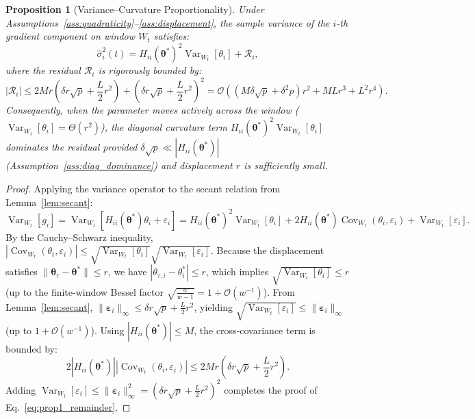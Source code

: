 \documentclass[11pt,a4paper]{article}
\newtheorem{proposition}{Proposition}
\begin{document}
\begin{proposition}[Variance--Curvature Proportionality]
\label{prop:variance_curvature}
Under Assumptions~\ref{ass:quadraticity}--\ref{ass:displacement}, the sample variance of the $i$-th gradient component on window $W_t$ satisfies:
\begin{equation}
\hat{\sigma}_i^2(t) = H_{ii}(\boldsymbol{\theta}^*)^2 \operatorname{Var}_{W_t}[\theta_i] + \mathcal{R}_i,
\end{equation}
where the residual $\mathcal{R}_i$ is rigorously bounded by:
\begin{equation}
|\mathcal{R}_i| \le 2 M r \left( \delta r \sqrt{p} + \frac{L}{2} r^2 \right) + \left( \delta r \sqrt{p} + \frac{L}{2} r^2 \right)^2 = \mathcal{O}\left( (M \delta \sqrt{p} + \delta^2 p) r^2 + M L r^3 + L^2 r^4 \right).
\label{eq:prop1_remainder}
\end{equation}
Consequently, when the parameter moves actively across the window ($\operatorname{Var}_{W_t}[\theta_i] = \Theta(r^2)$), the diagonal curvature term $H_{ii}(\boldsymbol{\theta}^*)^2 \operatorname{Var}_{W_t}[\theta_i]$ dominates the residual provided $\delta \sqrt{p} \ll |H_{ii}(\boldsymbol{\theta}^*)|$ (Assumption~\ref{ass:diag_dominance}) and displacement $r$ is sufficiently small.
\end{proposition}

\begin{proof}
Applying the variance operator to the secant relation from Lemma~\ref{lem:secant}:
\begin{equation}
\operatorname{Var}_{W_t}[g_i] = \operatorname{Var}_{W_t}\left[ H_{ii}(\boldsymbol{\theta}^*) \theta_i + \varepsilon_i \right] = H_{ii}(\boldsymbol{\theta}^*)^2 \operatorname{Var}_{W_t}[\theta_i] + 2 H_{ii}(\boldsymbol{\theta}^*) \operatorname{Cov}_{W_t}(\theta_i, \varepsilon_i) + \operatorname{Var}_{W_t}[\varepsilon_i].
\end{equation}
By the Cauchy--Schwarz inequality, $|\operatorname{Cov}_{W_t}(\theta_i, \varepsilon_i)| \le \sqrt{\operatorname{Var}_{W_t}[\theta_i]} \sqrt{\operatorname{Var}_{W_t}[\varepsilon_i]}$. Because the displacement satisfies $\|\boldsymbol{\theta}_\tau - \boldsymbol{\theta}^*\| \le r$, we have $|\theta_{\tau,i} - \theta_i^*| \le r$, which implies $\sqrt{\operatorname{Var}_{W_t}[\theta_i]} \le r$ (up to the finite-window Bessel factor $\sqrt{\frac{w}{w-1}} = 1 + \mathcal{O}(w^{-1})$). From Lemma~\ref{lem:secant}, $\|\boldsymbol{\varepsilon}_i\|_\infty \le \delta r \sqrt{p} + \frac{L}{2} r^2$, yielding $\sqrt{\operatorname{Var}_{W_t}[\varepsilon_i]} \le \|\boldsymbol{\varepsilon}_i\|_\infty$ (up to $1 + \mathcal{O}(w^{-1})$). Using $|H_{ii}(\boldsymbol{\theta}^*)| \le M$, the cross-covariance term is bounded by:
\begin{equation}
2 |H_{ii}(\boldsymbol{\theta}^*)| |\operatorname{Cov}_{W_t}(\theta_i, \varepsilon_i)| \le 2 M r \left( \delta r \sqrt{p} + \frac{L}{2} r^2 \right).
\end{equation}
Adding $\operatorname{Var}_{W_t}[\varepsilon_i] \le \|\boldsymbol{\varepsilon}_i\|_\infty^2 = (\delta r \sqrt{p} + \frac{L}{2} r^2)^2$ completes the proof of Eq.~\eqref{eq:prop1_remainder}.
\end{proof}
\end{document}
